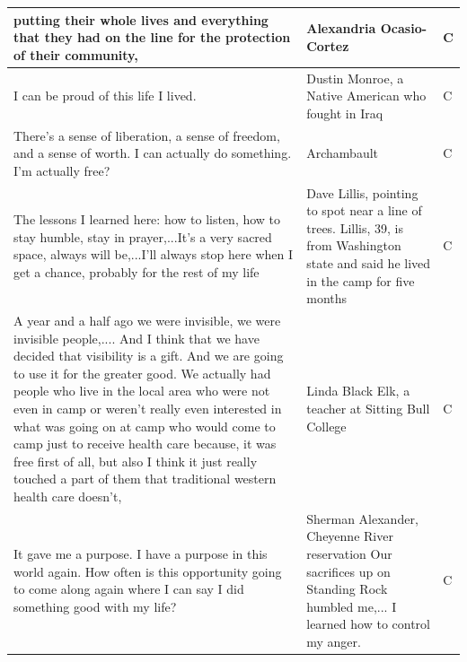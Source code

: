 \begin{footnotesize}
\begin{spacing}{1}
\begin{longtable}{| p{} | P{.25\textwidth} | p{.07\textwidth}|}
putting their whole lives and everything that they had on the line for the protection of their community,                                                             & Alexandria Ocasio-Cortez                     & C              \\ \hline
I can be proud of this life I lived.                                                                & Dustin Monroe, a Native American who fought in Iraq                                                            & C              \\ \hline
There's a sense of liberation, a sense of freedom, and a sense of worth. I can actually do something. I'm actually free?                                              & Archambault                                  & C              \\ \hline
The lessons I learned here: how to listen, how to stay humble, stay in prayer,...It's a very sacred space, always will be,...I'll always stop here when I get a chance, probably for the rest of my life                                                      & Dave Lillis, pointing to spot near a line of trees. Lillis, 39, is from Washington state and said he lived in the camp for five months                                                             & C              \\ \hline
A year and a half ago we were invisible, we were invisible people,.... And I think that we have decided that visibility is a gift. And we are going to use it for the greater good. We actually had people who live in the local area who were not even in camp or weren't really even interested in what was going on at camp who would come to camp just to receive health care because, it was free first of all, but also I think it just really touched a part of them that traditional western health care doesn't,                                               & Linda Black Elk, a teacher at Sitting Bull College                                                             & C              \\ \hline
It gave me a purpose. I have a purpose in this world again. How often is this opportunity going to come along again where I can say I did something good with my life?                                                                                    & Sherman Alexander, Cheyenne River reservation Our sacrifices up on Standing Rock humbled me,... I learned how to control my anger.                                                                   & C              \\ \hline

\end{longtable}
\end{spacing}
\end{footnotesize}
